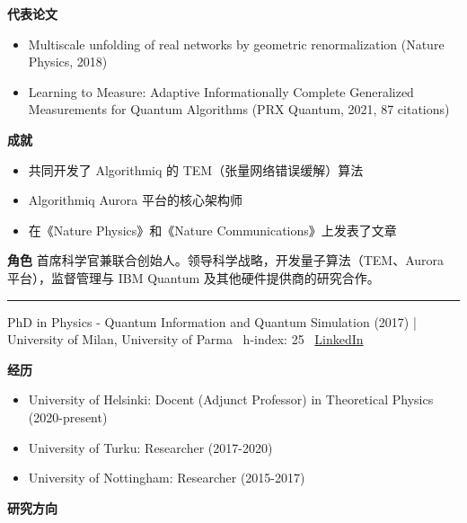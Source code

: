 \par{\footnotesize\color{mainred}\textbf{代表论文}}
\begin{itemize}[leftmargin=1.2em,itemsep=0pt,topsep=0pt]
\item {\footnotesize Multiscale unfolding of real networks by geometric renormalization (Nature Physics, 2018)}
\item {\footnotesize Learning to Measure: Adaptive Informationally Complete Generalized Measurements for Quantum Algorithms (PRX Quantum, 2021, 87 citations)}
\end{itemize}
\par{\footnotesize\color{mainred}\textbf{成就}}
\begin{itemize}[leftmargin=1.2em,itemsep=0pt,topsep=0pt]
\item {\footnotesize 共同开发了 Algorithmiq 的 TEM（张量网络错误缓解）算法}
\item {\footnotesize Algorithmiq Aurora 平台的核心架构师}
\item {\footnotesize 在《Nature Physics》和《Nature Communications》上发表了文章}
\end{itemize}
\par{\footnotesize\color{mainred}\textbf{角色}} {\footnotesize 首席科学官兼联合创始人。领导科学战略，开发量子算法（TEM、Aurora 平台），监督管理与 IBM Quantum 及其他硬件提供商的研究合作。}
\vspace{2pt}\hrule\vspace{2pt}
\vspace{4pt}
\par{\footnotesize\color{graytext}PhD in Physics - Quantum Information and Quantum Simulation (2017) | University of Milan, University of Parma \textbar\  h-index: 25 \textbar\  \href{https://www.linkedin.com/in/matteo-rossi-9ab6b3183/}{LinkedIn}}
\par{\footnotesize\color{mainred}\textbf{经历}}
\begin{itemize}[leftmargin=1.2em,itemsep=0pt,topsep=0pt]
\item {\footnotesize University of Helsinki: Docent (Adjunct Professor) in Theoretical Physics (2020-present)}
\item {\footnotesize University of Turku: Researcher (2017-2020)}
\item {\footnotesize University of Nottingham: Researcher (2015-2017)}
\end{itemize}
\par{\footnotesize\color{mainred}\textbf{研究方向}}
